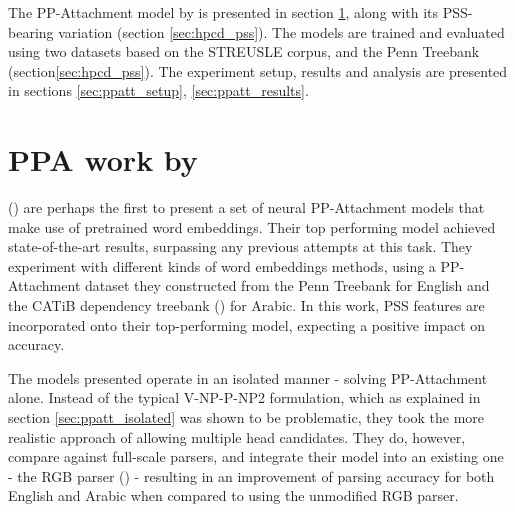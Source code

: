 The PP-Attachment model by \cite{hpcd} is presented in section \ref{sec:ppatt-belinkov}, along with its PSS-bearing variation (section \ref{sec:hpcd_pss}). The models are trained and evaluated using two datasets based on the STREUSLE corpus, and the Penn Treebank (section\ref{sec:hpcd_pss}). The experiment setup, results and analysis are presented in sections \ref{sec:ppatt_setup}, \ref{sec:ppatt_results}.

\section{PPA work by \cite{hpcd}} \label{sec:ppatt-belinkov}

(\cite{hpcd}) are perhaps the first to present a set of neural PP-Attachment models that make use of pretrained word embeddings. Their top performing model achieved state-of-the-art results, surpassing any previous attempts at this task. They experiment with different kinds of word embeddings methods, using a PP-Attachment dataset they constructed from the Penn Treebank for English and the CATiB dependency treebank (\cite{habash09mada}) for Arabic. In this work, PSS features are incorporated onto their top-performing model, expecting a positive impact on accuracy. 

The models presented operate in an isolated manner - solving PP-Attachment alone. Instead of the typical V-NP-P-NP2 formulation, which as explained in section \ref{sec:ppatt_isolated} was shown to be problematic, they took the more realistic approach of allowing multiple head candidates. They do, however, compare against full-scale parsers, and integrate their model into an existing one - the RGB parser (\cite{lei-etal-14-low}) - resulting in an improvement of parsing accuracy for both English and Arabic when compared to using the unmodified RGB parser.

